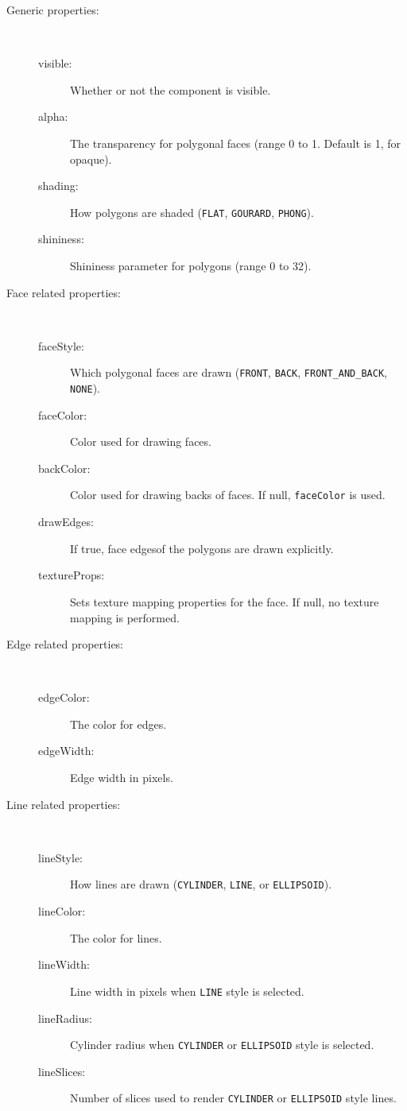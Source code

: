 \documentclass{article}
\begin{document}
\begin{description}

\item[Generic properties:]
\hfil \\
\begin{description}
\item[visible:]
Whether or not the component is visible.
\item[alpha:]
The transparency for polygonal faces (range 0 to 1. Default is 1, for
opaque).
\item[shading:]
How polygons are shaded ({\tt FLAT}, {\tt GOURARD}, {\tt PHONG}).
\item[shininess:]
Shininess parameter for polygons (range 0 to 32).
\end{description}

\item[Face related properties:]
\hfil \\
\begin{description}
\item[faceStyle:]
Which polygonal faces are drawn ({\tt FRONT}, {\tt BACK},
{\tt FRONT\_AND\_BACK}, {\tt NONE}).
\item[faceColor:] 
Color used for drawing faces.
\item[backColor:]
Color used for drawing backs of faces. If null, {\tt faceColor} is used.
\item[drawEdges:] 	
If true, face edgesof the polygons are drawn explicitly.
\item[textureProps:] 
Sets texture mapping properties for the face. If null, no texture
mapping is performed.
\end{description}

\item[Edge related properties:]
\hfil \\
\begin{description}
\item[edgeColor:]
The color for edges.
\item[edgeWidth:]
Edge width in pixels.
\end{description}

\item[Line related properties:]
\hfil \\
\begin{description}
\item[lineStyle:] 
How lines are drawn ({\tt CYLINDER}, {\tt LINE}, or {\tt ELLIPSOID}).
\item[lineColor:]
The color for lines.
\item[lineWidth:]
Line width in pixels when {\tt LINE} style is selected.
\item[lineRadius:]
Cylinder radius when {\tt CYLINDER} or {\tt ELLIPSOID} style is selected.
\item[lineSlices:]
Number of slices used to render {\tt CYLINDER} or {\tt ELLIPSOID} style lines.
\end{description}


\end{description}
\end{document}

